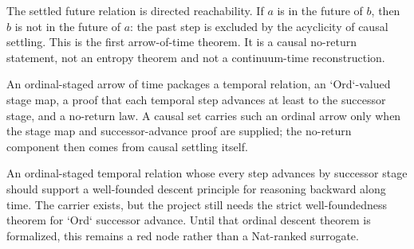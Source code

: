 \begin{theorem}\label{thm:causal-arrow-no-return}\leanok{}
The settled future relation is directed reachability. If $a$ is in the future of
$b$, then $b$ is not in the future of $a$: the past step is excluded by the
acyclicity of causal settling. This is the first arrow-of-time theorem. It is a
causal no-return statement, not an entropy theorem and not a continuum-time
reconstruction.
\end{theorem}

\begin{theorem}\label{thm:ordinal-arrow-successor-advance}\leanok{}
An ordinal-staged arrow of time packages a temporal relation, an `Ord`-valued
stage map, a proof that each temporal step advances at least to the successor
stage, and a no-return law. A causal set carries such an ordinal arrow only when
the stage map and successor-advance proof are supplied; the no-return component
then comes from causal settling itself.
\end{theorem}

\begin{theorem}\label{thm:ordinal-stage-well-founded-descent}\notready{}
An ordinal-staged temporal relation whose every step advances by successor
stage should support a well-founded descent principle for reasoning backward
along time. The carrier exists, but the project still needs the strict
well-foundedness theorem for `Ord` successor advance. Until that ordinal descent
theorem is formalized, this remains a red node rather than a Nat-ranked
surrogate.
\end{theorem}

